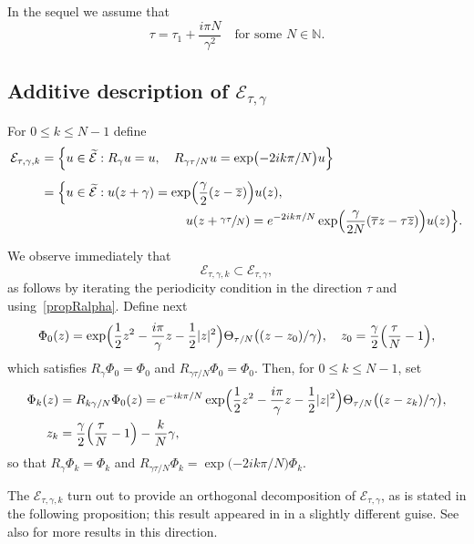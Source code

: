 \documentclass[10pt]{amsart}
\theoremstyle{definition}
\let\EE\exp
\let\ov\overline
\newcommand\N{\mathbb N}
\newcommand\E{\mathcal E}
\begin{document}
In the sequel we assume that
\begin{equation*}
\tau=\tau_1+\frac{i\pi N}{\gamma^2}\quad \text{for some } N \in \N.
\end{equation*}

\subsection{Additive description of $\E_{\tau,\gamma}$}

For $0\leq k\leq N-1$ define
\begin{align*}
\mathcal{E}_{\tau,\gamma,k}&=\Bigl\{u\in \widetilde{\mathcal{E}}: R_\gamma u=u,\quad R_{{\gamma \tau}/N} u= \EE\bigl({-{2ik\pi}/N}\bigr) u\Bigr\}\\[5pt]
&=\Bigl\{u\in \widetilde{\mathcal{E}}: u(z+\gamma)=\EE\Bigl(\frac{\gamma}2(z-\ov{z})\Bigr) u(z),\\
&\hspace*{4cm}u(z+\sfrac{\gamma \tau}{N})= e^{-{2ik\pi}/N} \EE\Bigl(\frac{\gamma}{2N} (\ov{\tau}z-\tau\ov{z})\Bigr)u(z)\Bigr\}.
\end{align*}

We observe immediately that
\[
\mathcal{E}_{\tau,\gamma,k} \subset \mathcal{E}_{\tau,\gamma},
\]
as follows by iterating the periodicity condition in the direction $\tau$ and using~\eqref{propRalpha}.
Define next
\begin{equation}\label{defPhi0}
\Phi_{0}(z)=\EE\Bigl({\frac{1}{2} z^2 -\frac{i\pi}{\gamma} z - \frac{1}{2} |z|^2} \Bigr) \Theta_{{\tau}/{N}}\bigl((z-z_{0})/{\gamma}\bigr), \quad z_0=\frac{\gamma}2 \Bigl(\frac{\tau}N-1 \Bigr),
\end{equation}
which satisfies $R_\gamma \Phi_{0}= \Phi_{0}$ and $R_{{\gamma \tau}/N} \Phi_{0}= \Phi_{0}$. Then,
for $0\leq k\leq N-1$, set
\begin{align*}
\Phi_{k}(z)&=R_{{k \gamma}/N} \Phi_{0}(z)=e^{-{ik\pi}/N}\EE\Bigl({\frac{1}{2} z^2 -\frac{i\pi}{\gamma} z - \frac{1}{2} |z|^2} \Bigr)\Theta_{{\tau}/{N}}\bigl((z-z_{k})/\gamma\bigr),
\\
z_k&=\frac{\gamma}2 \Bigl(\frac{\tau}N-1 \Bigr)-\frac{k}{N}\gamma,
\end{align*}
so that $R_\gamma \Phi_{k}= \Phi_{k}$ and $R_{{\gamma \tau}/N} \Phi_{k}=\EE\bigl({-{2ik\pi}/N}\bigr) \Phi_{k}$. 

The $\mathcal{E}_{\tau,\gamma,k}$ turn out to provide an orthogonal decomposition of $\mathcal{E}_{\tau,\gamma}$, as is stated in the following proposition; this result appeared in \cite{Nier2} in a slightly different guise. See also \cite{Perice,Nguyen-Rougerie} for more results in this direction.
\end{document}
